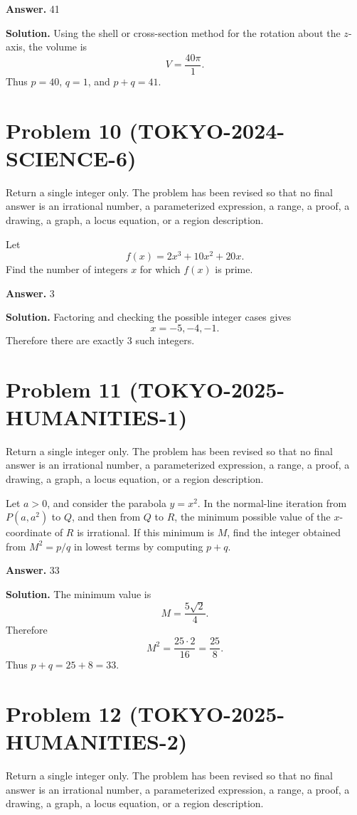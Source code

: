 \documentclass[11pt]{article}
\begin{document}
\textbf{Answer.} 41


\textbf{Solution.}
Using the shell or cross-section method for the rotation about the \(z\)-axis,
the volume is
\[
V=\frac{40\pi}{1}.
\]
Thus \(p=40\), \(q=1\), and \(p+q=41\).


\section*{Problem 10 (TOKYO-2024-SCIENCE-6)}

Return a single integer only. The problem has been revised so that no final answer is an irrational number, a parameterized expression, a range, a proof, a drawing, a graph, a locus equation, or a region description.

Let
\[
f(x)=2x^3+10x^2+20x.
\]
Find the number of integers \(x\) for which \(f(x)\) is prime.


\textbf{Answer.} 3


\textbf{Solution.}
Factoring and checking the possible integer cases gives
\[
x=-5,-4,-1.
\]
Therefore there are exactly \(3\) such integers.


\section*{Problem 11 (TOKYO-2025-HUMANITIES-1)}

Return a single integer only. The problem has been revised so that no final answer is an irrational number, a parameterized expression, a range, a proof, a drawing, a graph, a locus equation, or a region description.

Let \(a>0\), and consider the parabola \(y=x^2\). In the normal-line iteration
from \(P(a,a^2)\) to \(Q\), and then from \(Q\) to \(R\), the minimum possible
value of the \(x\)-coordinate of \(R\) is irrational. If this minimum is \(M\),
find the integer obtained from \(M^2=p/q\) in lowest terms by computing
\(p+q\).


\textbf{Answer.} 33


\textbf{Solution.}
The minimum value is
\[
M=\frac{5\sqrt2}{4}.
\]
Therefore
\[
M^2=\frac{25\cdot2}{16}=\frac{25}{8}.
\]
Thus \(p+q=25+8=33\).


\section*{Problem 12 (TOKYO-2025-HUMANITIES-2)}

Return a single integer only. The problem has been revised so that no final answer is an irrational number, a parameterized expression, a range, a proof, a drawing, a graph, a locus equation, or a region description.
\end{document}
